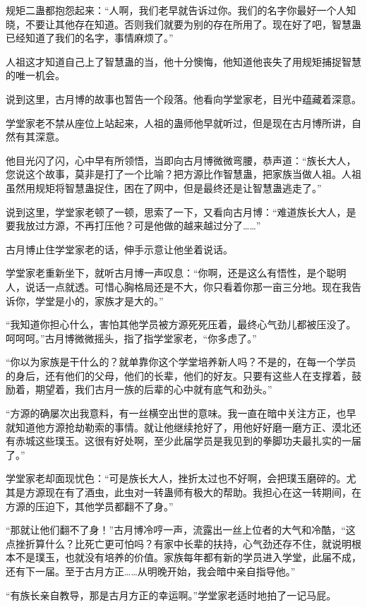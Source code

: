 \begin{this_body}
规矩二蛊都抱怨起来：“人啊，我们老早就告诉过你。我们的名字你最好一个人知晓，不要让其他存在知道。否则我们就要为别的存在所用了。现在好了吧，智慧蛊已经知道了我们的名字，事情麻烦了。”

人祖这才知道自己上了智慧蛊的当，他十分懊悔，他知道他丧失了用规矩捕捉智慧的唯一机会。

说到这里，古月博的故事也暂告一个段落。他看向学堂家老，目光中蕴藏着深意。

学堂家老不禁从座位上站起来，人祖的蛊师他早就听过，但是现在古月博所讲，自然有其深意。

他目光闪了闪，心中早有所领悟，当即向古月博微微弯腰，恭声道：“族长大人，您说这个故事，莫非是打了一个比喻？把方源比作智慧蛊，把家族当做人祖。人祖虽然用规矩将智慧蛊捉住，困在了网中，但是最终还是让智慧蛊逃走了。”

说到这里，学堂家老顿了一顿，思索了一下，又看向古月博：“难道族长大人，是要我放过方源，不再打压他？可是他做的越来越过分了……”

古月博止住学堂家老的话，伸手示意让他坐着说话。

学堂家老重新坐下，就听古月博一声叹息：“你啊，还是这么有悟性，是个聪明人，说话一点就透。可惜心胸格局还是不大，你只看着你那一亩三分地。现在我告诉你，学堂是小的，家族才是大的。”

“我知道你担心什么，害怕其他学员被方源死死压着，最终心气劲儿都被压没了。呵呵呵。”古月博微微摇头，指了指学堂家老，“你多虑了。”

“你以为家族是干什么的？就单靠你这个学堂培养新人吗？不是的，在每一个学员的身后，还有他们的父母，他们的长辈，他们的好友。只要有这些人在支撑着，鼓励着，期望着，我们古月一族的后辈的心中就有底气和劲头。”

“方源的确屡次出我意料，有一丝横空出世的意味。我一直在暗中关注方正，也早就知道他方源抢劫勒索的事情。就让他继续抢好了，用他好好磨一磨方正、漠北还有赤城这些璞玉。这很有好处啊，至少此届学员是我见到的拳脚功夫最扎实的一届了。”

学堂家老却面现忧色：“可是族长大人，挫折太过也不好啊，会把璞玉磨碎的。尤其是方源现在有了酒虫，此虫对一转蛊师有极大的帮助。我担心在这一转期间，在方源的压迫下，其他学员都翻不了身。”

“那就让他们翻不了身！”古月博冷哼一声，流露出一丝上位者的大气和冷酷，“这点挫折算什么？比死亡更可怕吗？有家中长辈的扶持，心气劲还存不住，就说明根本不是璞玉，也就没有培养的价值。家族每年都有新的学员进入学堂，此届不成，还有下一届。至于古月方正……从明晚开始，我会暗中亲自指导他。”

“有族长亲自教导，那是古月方正的幸运啊。”学堂家老适时地拍了一记马屁。


\end{this_body}
